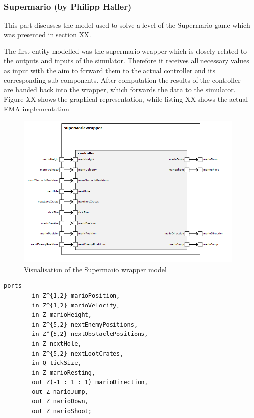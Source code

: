 \newpage
\subsubsection{Supermario (by Philipp Haller)}

This part discusses the model used to solve a level of the Supermario game which was presented in section XX. 

The first entity modelled was the supermario wrapper which is closely related to the outputs and inputs of the simulator. Therefore it receives all necessary values as input with the aim to forward them to the actual controller and its corresponding sub-components. After computation the results of the controller are handed back into the wrapper, which forwards the data to the simulator. Figure XX shows the graphical representation, while listing XX shows the actual EMA implementation.
\begin{figure}
	\centering
	\includegraphics[scale=0.5]{pictures/haller_supermariowrapper.PNG}
	\caption{Visualisation of the Supermario wrapper model}
	\label{fig:marioWrapper}
\end{figure}

\begin{lstlisting}[label=lst:marioWrapperInterface, caption=Interface of the Supermario Wrapper, morekeywords={ports, port, connect, in, out, instance, ->},
frame=single]
    ports   
        in Z^{1,2} marioPosition,
        in Z^{1,2} marioVelocity,
        in Z marioHeight,
        in Z^{5,2} nextEnemyPositions,
        in Z^{5,2} nextObstaclePositions,
        in Z nextHole,
        in Z^{5,2} nextLootCrates,
        in Q tickSize,
        in Z marioResting,
        out Z(-1 : 1 : 1) marioDirection,
        out Z marioJump,
        out Z marioDown,
        out Z marioShoot;
\end{lstlisting}

